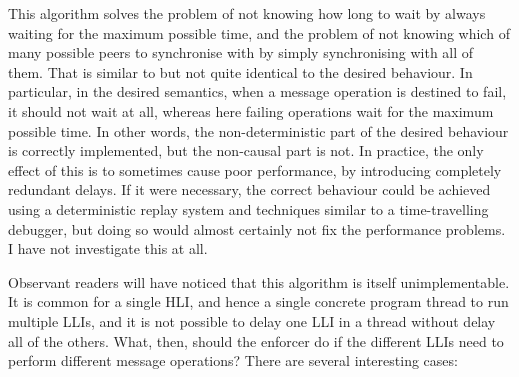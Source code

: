 This algorithm solves the problem of not knowing how long to wait by
always waiting for the maximum possible time, and the problem of not
knowing which of many possible peers to synchronise with by simply
synchronising with all of them.  That is similar to but not quite
identical to the desired behaviour.  In particular, in the desired
semantics, when a message operation is destined to fail, it should not
wait at all, whereas here failing operations wait for the maximum
possible time.  In other words, the non-deterministic part of the
desired behaviour is correctly implemented, but the non-causal part is
not.  In practice, the only effect of this is to sometimes cause poor
performance, by introducing completely redundant delays.  If it were
necessary, the correct behaviour could be achieved using a
deterministic replay system\needCite{} and techniques similar to a
time-travelling debugger\needCite{}, but doing so would almost
certainly not fix the performance problems.  I have not investigate
this at all.

Observant readers will have noticed that this algorithm is itself
unimplementable.  It is common for a single HLI, and hence a single
concrete program thread to run multiple LLIs, and it is not possible
to delay one LLI in a thread without delay all of the others.  What,
then, should the enforcer do if the different LLIs need to perform
different message operations?  There are several interesting cases:

